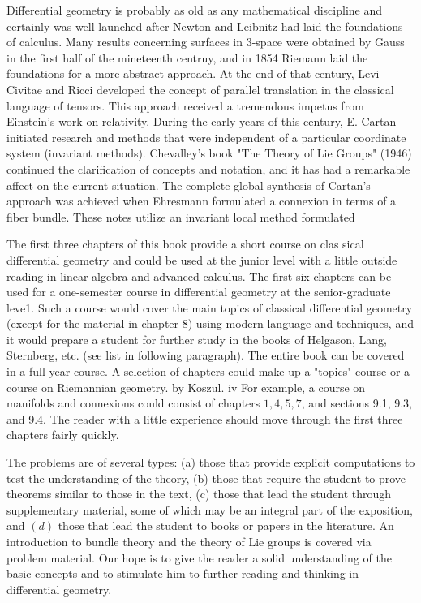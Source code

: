 \documentclass[10pt]{article}
\begin{document}
Differential geometry is probably as old as any mathematical discipline and certainly was well launched after Newton and Leibnitz had laid the foundations of calculus. Many results concerning surfaces in 3-space were obtained by Gauss in the first half of the mineteenth centruy, and in 1854 Riemann laid the foundations for a more abstract approach. At the end of that century, Levi-Civitae and Ricci developed the concept of parallel translation in the classical language of tensors. This approach received a tremendous impetus from Einstein's work on relativity. During the early years of this century, E. Cartan initiated research and methods that were independent of a particular coordinate system (invariant methods). Chevalley's book "The Theory of Lie Groups" (1946) continued the clarification of concepts and notation, and it has had a remarkable affect on the current situation. The complete global synthesis of Cartan's approach was achieved when Ehresmann formulated a connexion in terms of a fiber bundle. These notes utilize an invariant local method formulated

The first three chapters of this book provide a short course on clas sical differential geometry and could be used at the junior level with a little outside reading in linear algebra and advanced calculus. The first six chapters can be used for a one-semester course in differential geometry at the senior-graduate leve1. Such a course would cover the main topics of classical differential geometry (except for the material in chapter 8) using modern language and techniques, and it would prepare a student for further study in the books of Helgason, Lang, Sternberg, etc. (see list in following paragraph). The entire book can be covered in a full year course. A selection of chapters could make up a "topics" course or a course on Riemannian geometry. by Koszul. iv For example, a course on manifolds and connexions could consist of chapters $1,4,5,7$, and sections 9.1, 9.3, and 9.4. The reader with a little experience should move through the first three chapters fairly quickly.

The problems are of several types: (a) those that provide explicit computations to test the understanding of the theory, (b) those that require the student to prove theorems similar to those in the text, (c) those that lead the student through supplementary material, some of which may be an integral part of the exposition, and $(d)$ those that lead the student to books or papers in the literature. An introduction to bundle theory and the theory of Lie groups is covered via problem material. Our hope is to give the reader a solid understanding of the basic concepts and to stimulate him to further reading and thinking in differential geometry.
\end{document}
